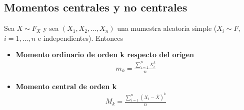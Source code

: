 \subsection{Momentos centrales y no centrales}

Sea $X \sim F_X$ y sea $(X_1, X_2,..., X_n)$ una mumestra aleatoria simple ($X_i \sim F$, $i = 1,...,n$ e independientes). Entonces
\begin{itemize}
    \item \textbf{Momento ordinario de orden k respecto del origen}
    \begin{align*}
        m_k = \frac{\sum_{i=1}^{n}{X_i^k}}{n}
    \end{align*}
    \item \textbf{Momento central de orden k}
    \begin{align*}
        M_k = \frac{\sum_{i=1}^{n}{(X_i - \overline{X})^k}}{n}
    \end{align*}
\end{itemize}

